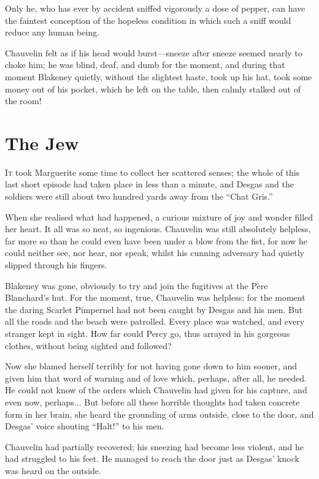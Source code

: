 \documentclass[paper=5.5in:8.5in,BCOR=7mm,twoside,DIV=calc,12pt,usegeometry,chapterprefix,endperiod,headings=big]{scrbook}
\begin{document}
Only he, who has ever by accident sniffed vigorously a dose of pepper, can have the faintest conception of the hopeless condition in which such a sniff would reduce any human being.

Chauvelin felt as if his head would burst---sneeze after sneeze seemed nearly to choke him; he was blind, deaf, and dumb for the moment, and during that moment Blakeney quietly, without the slightest haste, took up his hat, took some money out of his pocket, which he left on the table, then calmly stalked out of the room!

\chapter{The Jew}
\lettrine[lines=4]{I}{t} took Marguerite some time to collect her scattered senses; the whole of this last short episode had taken place in less than a minute, and Desgas and the soldiers were still about two hundred yards away from the \enquote{Chat Gris.}

When she realised what had happened, a curious mixture of joy and wonder filled her heart. It all was so neat, so ingenious. Chauvelin was still absolutely helpless, far more so than he could even have been under a blow from the fist, for now he could neither see, nor hear, nor speak, whilst his cunning adversary had quietly slipped through his fingers.

Blakeney was gone, obviously to try and join the fugitives at the Père Blanchard's hut. For the moment, true, Chauvelin was helpless; for the moment the daring Scarlet Pimpernel had not been caught by Desgas and his men. But all the roads and the beach were patrolled. Every place was watched, and every stranger kept in sight. How far could Percy go, thus arrayed in his gorgeous clothes, without being sighted and followed?

Now she blamed herself terribly for not having gone down to him sooner, and given him that word of warning and of love which, perhaps, after all, he needed. He could not know of the orders which Chauvelin had given for his capture, and even now, perhaps... But before all these horrible thoughts had taken concrete form in her brain, she heard the grounding of arms outside, close to the door, and Desgas’ voice shouting \enquote{Halt!} to his men.

Chauvelin had partially recovered; his sneezing had become less violent, and he had struggled to his feet. He managed to reach the door just as Desgas’ knock was heard on the outside.
\end{document}
